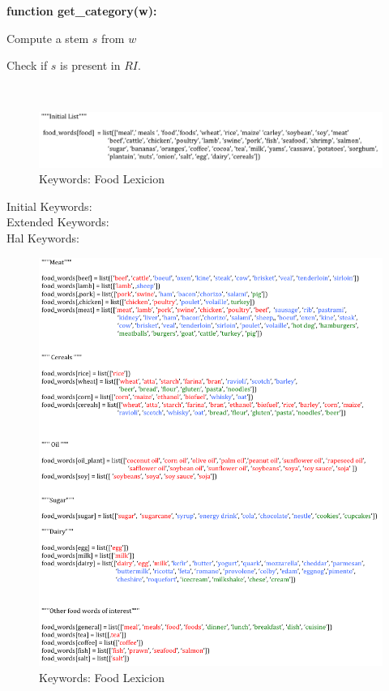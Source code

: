 \documentclass[12pt]{report}
\begin{document}
\textbf{function get\_category(w):}

\indent
\begin{algorithm}[H]
Compute a stem $s$ from $w$ \par
Check if $s$ is present in $RI$.

\end{algorithm}
\noindent \\





 \begin{figure}[H]
\centerline{ \noindent\includegraphics[width=1\textwidth]{img/abs/ini_lex}}
 \caption{Keywords: Food Lexicion}
 \label{fig:flex}
\end{figure}

 \color{red} Initial Keywords: \\
 \color{blue}Extended Keywords:  \\
\color{green}Hal Keywords:  \\


 \begin{figure}[H]
\centerline{ \noindent\includegraphics[width=1\textwidth]{img/abs/hyrach_lex}}
 \caption{Keywords: Food Lexicion}
 \label{fig:flex}
\end{figure}
\end{document}
